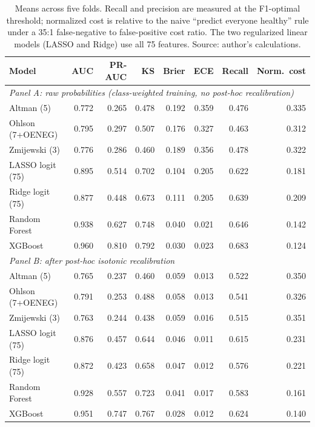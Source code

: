 \documentclass[12pt,a4paper]{article}
\begin{document}
\begin{table}[ht]
\centering
\caption{Performance of all seven models at horizon H1, before and after
isotonic recalibration.$^{*}$}
\label{tab:full-comparison}
\small
\begin{tabular}{lrrrrrrr}
\toprule
Model & AUC & PR-AUC & KS & Brier & ECE & Recall & Norm.\ cost \\
\midrule
\multicolumn{8}{l}{\textit{Panel A: raw probabilities (class-weighted training, no post-hoc recalibration)}} \\
\midrule
Altman (5)         & 0.772 & 0.265 & 0.478 & 0.192 & 0.359 & 0.476 & 0.335 \\
Ohlson (7+OENEG)   & 0.795 & 0.297 & 0.507 & 0.176 & 0.327 & 0.463 & 0.312 \\
Zmijewski (3)      & 0.776 & 0.286 & 0.460 & 0.189 & 0.356 & 0.478 & 0.322 \\
LASSO logit (75)   & 0.895 & 0.514 & 0.702 & 0.104 & 0.205 & 0.622 & 0.181 \\
Ridge logit (75)   & 0.877 & 0.448 & 0.673 & 0.111 & 0.205 & 0.639 & 0.209 \\
Random Forest      & 0.938 & 0.627 & 0.748 & 0.040 & 0.021 & 0.646 & 0.142 \\
XGBoost            & 0.960 & 0.810 & 0.792 & 0.030 & 0.023 & 0.683 & 0.124 \\
\midrule
\multicolumn{8}{l}{\textit{Panel B: after post-hoc isotonic recalibration}} \\
\midrule
Altman (5)         & 0.765 & 0.237 & 0.460 & 0.059 & 0.013 & 0.522 & 0.350 \\
Ohlson (7+OENEG)   & 0.791 & 0.253 & 0.488 & 0.058 & 0.013 & 0.541 & 0.326 \\
Zmijewski (3)      & 0.763 & 0.244 & 0.438 & 0.059 & 0.016 & 0.515 & 0.351 \\
LASSO logit (75)   & 0.876 & 0.457 & 0.644 & 0.046 & 0.011 & 0.615 & 0.231 \\
Ridge logit (75)   & 0.872 & 0.423 & 0.658 & 0.047 & 0.012 & 0.576 & 0.221 \\
Random Forest      & 0.928 & 0.557 & 0.723 & 0.041 & 0.017 & 0.583 & 0.161 \\
XGBoost            & 0.951 & 0.747 & 0.767 & 0.028 & 0.012 & 0.624 & 0.140 \\
\bottomrule
\end{tabular}
\caption*{\footnotesize Means across five folds. Recall and precision are
measured at the F1-optimal threshold; normalized cost is relative to the naive
``predict everyone healthy'' rule under a 35:1 false-negative to false-positive
cost ratio. The two regularized linear models (LASSO and Ridge) use all 75
features. Source: author's calculations.}
\end{table}
\end{document}
